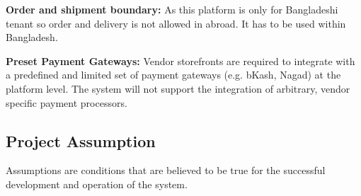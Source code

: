     \textbf{Order and shipment boundary:} As this platform is only for Bangladeshi tenant so order and delivery is not allowed in abroad. It has to be used within Bangladesh.	

    \textbf{Preset Payment Gateways:} Vendor storefronts are required to integrate with a predefined and limited set of payment gateways (e.g. bKash, Nagad) at the platform level. The system will not support the integration of arbitrary, vendor specific payment processors.

\subsection{Project Assumption}
\label{sec:project-assumption}

Assumptions are conditions that are believed to be true for the successful development and operation of the system.

